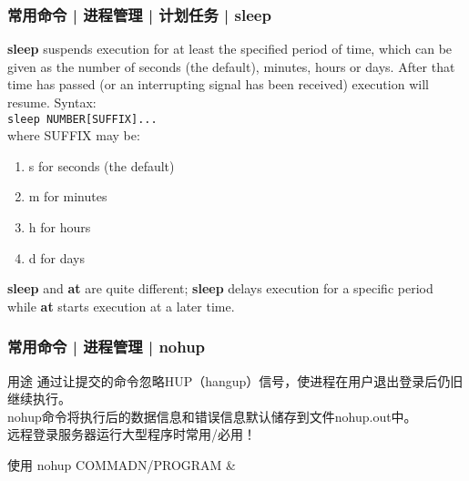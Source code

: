 \begin{frame}[fragile]
  \frametitle{常用命令 | 进程管理 | 计划任务 | sleep}
  \textbf{sleep} suspends execution for at least the specified period of time, which can be given as the number of seconds (the default), minutes, hours or days. After that time has passed (or an interrupting signal has been received) execution will resume. Syntax:\\
  \vspace{0.1cm}
  \verb|sleep NUMBER[SUFFIX]...|\\
  \vspace{0.1cm}
  where SUFFIX may be:
  \begin{enumerate}
    \item s for seconds (the default)
    \item m for minutes
    \item h for hours
    \item d for days
  \end{enumerate}
  \textbf{sleep} and \textbf{at} are quite different; \textbf{sleep} delays execution for a specific period while \textbf{at} starts execution at a later time.
\end{frame}

\begin{frame}
  \frametitle{常用命令 | 进程管理 | \alert{nohup}}
  \begin{block}{用途}
    通过让提交的命令忽略HUP（hangup）信号，使进程在用户退出登录后仍旧继续执行。\\ nohup命令将执行后的数据信息和错误信息默认储存到文件nohup.out中。\\ \alert{远程登录服务器运行大型程序时常用/必用！}
  \end{block}
  \pause
  \begin{block}{使用}
    nohup COMMADN/PROGRAM \&
  \end{block}
\end{frame}

